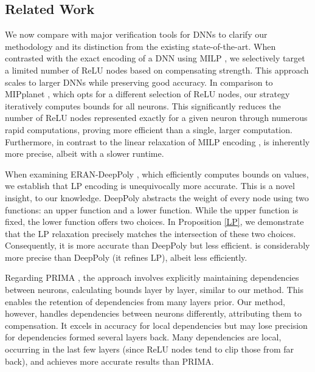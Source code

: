 \subsection{Related Work} 


We now compare {\CMP} with major verification tools for DNNs to clarify our methodology and its distinction from the existing state-of-the-art. When contrasted with the exact encoding of a DNN using MILP \cite{MILP}, we selectively target a limited number of ReLU nodes based on compensating strength. This approach scales to larger DNNs while preserving good accuracy. In comparison to MIPplanet \cite{MIPplanet}, which opts for a different selection of ReLU nodes, our strategy iteratively computes bounds for all neurons. This significantly reduces the number of ReLU nodes represented exactly for a given neuron through numerous rapid computations, proving more efficient than a single, larger computation. Furthermore, in contrast to the linear relaxation of MILP encoding \cite{MILP}, {\CMP} is inherently more precise, albeit with a slower runtime. 

When examining ERAN-DeepPoly \cite{deeppoly}, which efficiently computes bounds on values, we establish that LP encoding is unequivocally more accurate. This is a novel insight, to our knowledge. DeepPoly abstracts the weight of every node using two functions: an upper function and a lower function. While the upper function is fixed, the lower function offers two choices. In Proposition \ref{LP}, we demonstrate that the LP relaxation precisely matches the intersection of these two choices. Consequently, it is more accurate than DeepPoly but less efficient. \CMP is considerably more precise than DeepPoly (it refines LP), albeit less efficiently.

Regarding PRIMA \cite{prima}, the approach involves explicitly maintaining dependencies between neurons, calculating bounds layer by layer, similar to our method. This enables the retention of dependencies from many layers prior. Our method, however, handles dependencies between neurons differently, attributing them to compensation. It excels in accuracy for local dependencies but may lose precision for dependencies formed several layers back. Many dependencies are local, occurring in the last few layers (since ReLU nodes tend to clip those from far back), and \CMP achieves more accurate results than PRIMA.


